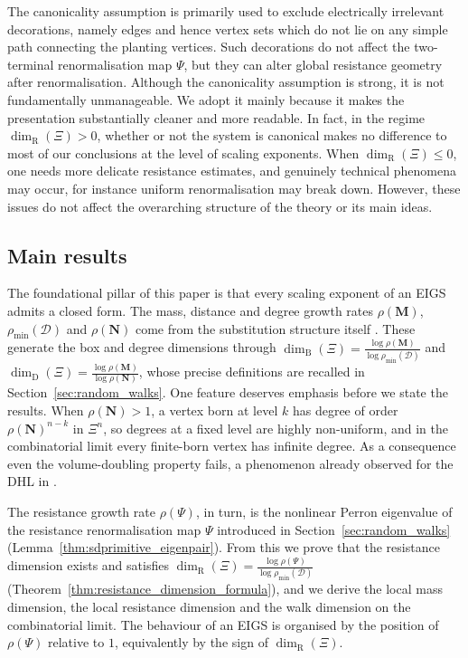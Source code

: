 \documentclass{article}
\theoremstyle{plain}
\theoremstyle{definition}
\newcommand{\dimbox}{\dim_\mathrm{B}}
\newcommand{\dimdeg}{\dim_\mathrm{D}}
\newcommand{\dimresis}{\dim_\mathrm{R}}
\begin{document}
The canonicality assumption is primarily used to exclude electrically irrelevant decorations, namely edges and hence vertex sets which do not lie on any simple path connecting the planting vertices.
Such decorations do not affect the two-terminal renormalisation map $\Psi$, but they can alter global resistance geometry after renormalisation.
Although the canonicality assumption is strong, it is not fundamentally unmanageable.
We adopt it mainly because it makes the presentation substantially cleaner and more readable.
In fact, in the regime $\dimresis(\Xi)>0$, whether or not the system is canonical makes no difference to most of our conclusions at the level of scaling exponents.
When $\dimresis(\Xi)\le 0$, one needs more delicate resistance estimates, and genuinely technical phenomena may occur, for instance uniform renormalisation may break down.
However, these issues do not affect the overarching structure of the theory or its main ideas.

\subsection{Main results}\label{subsec:main_results}

The foundational pillar of this paper is that every scaling exponent of an EIGS admits a closed form.
The mass, distance and degree growth rates $\rho(\mathbf M)$, $\rho_{\min}(\mathcal D)$ and $\rho(\mathbf N)$ come from the substitution structure itself \cite{neroli2024fractal,li2024on}.
These generate the box and degree dimensions through $\dimbox(\Xi)=\frac{\log\rho(\mathbf M)}{\log\rho_{\min}(\mathcal D)}$ and $\dimdeg(\Xi)=\frac{\log\rho(\mathbf M)}{\log\rho(\mathbf N)}$, whose precise definitions are recalled in Section~\ref{sec:random_walks}.
One feature deserves emphasis before we state the results.
When $\rho(\mathbf N)>1$, a vertex born at level $k$ has degree of order $\rho(\mathbf N)^{n-k}$ in $\Xi^n$, so degrees at a fixed level are highly non-uniform, and in the combinatorial limit every finite-born vertex has infinite degree.
As a consequence even the volume-doubling property fails, a phenomenon already observed for the DHL in \cite{hambly2010diffusion}.


The resistance growth rate $\rho(\Psi)$, in turn, is the nonlinear Perron eigenvalue of the resistance renormalisation map $\Psi$ introduced in Section~\ref{sec:random_walks} (Lemma~\ref{thm:sdprimitive_eigenpair}).
From this we prove that the resistance dimension exists and satisfies $\dimresis(\Xi)=\frac{\log\rho(\Psi)}{\log\rho_{\min}(\mathcal D)}$ (Theorem~\ref{thm:resistance_dimension_formula}), and we derive the local mass dimension, the local resistance dimension and the walk dimension on the combinatorial limit.
The behaviour of an EIGS is organised by the position of $\rho(\Psi)$ relative to $1$, equivalently by the sign of $\dimresis(\Xi)$.
\end{document}
